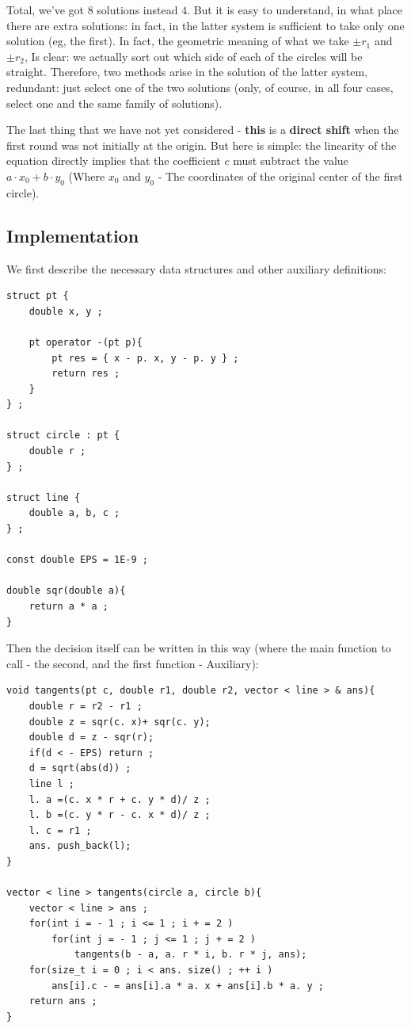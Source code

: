 Total, we've got $8$ solutions instead $4$. But it is easy to understand, in what place there are extra solutions: in fact, in the latter system is sufficient to take only one solution (eg, the first). In fact, the geometric meaning of what we take $\pm r_1$ and $\pm r_2$, Is clear: we actually sort out which side of each of the circles will be straight. Therefore, two methods arise in the solution of the latter system, redundant: just select one of the two solutions (only, of course, in all four cases, select one and the same family of solutions).

The last thing that we have not yet considered - \textbf{this} is a \textbf{direct shift} when the first round was not initially at the origin. But here is simple: the linearity of the equation directly implies that the coefficient $c$ must subtract the value $a \cdot x_0 + b \cdot y_0$ (Where $x_0$ and $y_0$ - The coordinates of the original center of the first circle).

\subsection{ Implementation }

We first describe the necessary data structures and other auxiliary definitions:

\begin{verbatim}
struct pt {
    double x, y ;
 
    pt operator -(pt p){
        pt res = { x - p. x, y - p. y } ;
        return res ;
    }
} ;
 
struct circle : pt {
    double r ;
} ;
 
struct line {
    double a, b, c ;
} ;
 
const double EPS = 1E-9 ;
 
double sqr(double a){
    return a * a ;
} 
\end{verbatim}
Then the decision itself can be written in this way (where the main function to call - the second, and the first function - Auxiliary):

\begin{verbatim}
void tangents(pt c, double r1, double r2, vector < line > & ans){
    double r = r2 - r1 ;
    double z = sqr(c. x)+ sqr(c. y);
    double d = z - sqr(r);
    if(d < - EPS) return ;
    d = sqrt(abs(d)) ;
    line l ;
    l. a =(c. x * r + c. y * d)/ z ;
    l. b =(c. y * r - c. x * d)/ z ;
    l. c = r1 ;
    ans. push_back(l);
}
 
vector < line > tangents(circle a, circle b){
    vector < line > ans ;
    for(int i = - 1 ; i <= 1 ; i + = 2 )
        for(int j = - 1 ; j <= 1 ; j + = 2 )
            tangents(b - a, a. r * i, b. r * j, ans);
    for(size_t i = 0 ; i < ans. size() ; ++ i )
        ans[i].c - = ans[i].a * a. x + ans[i].b * a. y ;
    return ans ;
} 
\end{verbatim}
